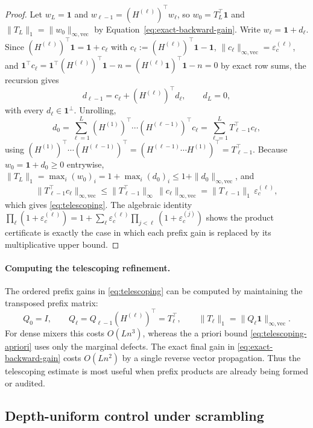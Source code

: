 \documentclass[10pt]{article}
\numberwithin{equation}{section}
\theoremstyle{plain}
\theoremstyle{definition}
\theoremstyle{remark}
\newcommand{\ones}{\mathbf{1}}
\begin{document}
\begin{proof}
Let $w_L=\ones$ and $w_{\ell-1}=(H^{(\ell)})^\top w_\ell$, so $w_0=T_L^\top\ones$ and
$\|T_L\|_1=\|w_0\|_{\infty,\mathrm{vec}}$ by Equation~\eqref{eq:exact-backward-gain}. Write
$w_\ell=\ones+d_\ell$. Since $(H^{(\ell)})^\top\ones=\ones+c_\ell$ with
$c_\ell:=(H^{(\ell)})^\top\ones-\ones$, $\|c_\ell\|_{\infty,\mathrm{vec}}=\varepsilon_c^{(\ell)}$,
and $\ones^\top c_\ell=\ones^\top(H^{(\ell)})^\top\ones-n=(H^{(\ell)}\ones)^\top\ones-n=0$
by exact row sums, the recursion gives
\[
d_{\ell-1}=c_\ell+(H^{(\ell)})^\top d_\ell,\qquad d_L=0,
\]
with every $d_\ell\in\ones^\perp$. Unrolling,
\[
d_0=\sum_{\ell=1}^L (H^{(1)})^\top\cdots (H^{(\ell-1)})^\top c_\ell
=\sum_{\ell=1}^L T_{\ell-1}^\top c_\ell ,
\]
using $(H^{(1)})^\top\cdots(H^{(\ell-1)})^\top=(H^{(\ell-1)}\cdots H^{(1)})^\top=T_{\ell-1}^\top$.
Because $w_0=\ones+d_0\ge 0$ entrywise,
$\|T_L\|_1=\max_i (w_0)_i=1+\max_i (d_0)_i\le 1+\|d_0\|_{\infty,\mathrm{vec}}$, and
\[
\|T_{\ell-1}^\top c_\ell\|_{\infty,\mathrm{vec}}
\le
\|T_{\ell-1}^\top\|_\infty\,\|c_\ell\|_{\infty,\mathrm{vec}}
=
\|T_{\ell-1}\|_1\,\varepsilon_c^{(\ell)},
\]
which gives \eqref{eq:telescoping}. The algebraic identity
$\prod_\ell(1+\varepsilon_c^{(\ell)})=1+\sum_\ell\varepsilon_c^{(\ell)}\prod_{j<\ell}(1+\varepsilon_c^{(j)})$
shows the product certificate is exactly the case in which each prefix gain is replaced by
its multiplicative upper bound.
\end{proof}

\paragraph{Computing the telescoping refinement.}
The ordered prefix gains in \eqref{eq:telescoping} can be computed by maintaining
the transposed prefix matrix:
\[
        Q_0=I,\qquad
        Q_\ell=Q_{\ell-1}(H^{(\ell)})^\top=T_\ell^\top,
        \qquad
        \|T_\ell\|_1=\|Q_\ell\ones\|_{\infty,\mathrm{vec}} .
\]
For dense mixers this costs \(O(Ln^3)\), whereas the a priori bound
\eqref{eq:telescoping-apriori} uses only the marginal defects. The exact final gain
in \eqref{eq:exact-backward-gain} costs \(O(Ln^2)\) by a single reverse vector
propagation. Thus the telescoping estimate is most useful when prefix products are
already being formed or audited.

\subsection{Depth-uniform control under scrambling}
\label{subsec:dobrushin}
\end{document}
